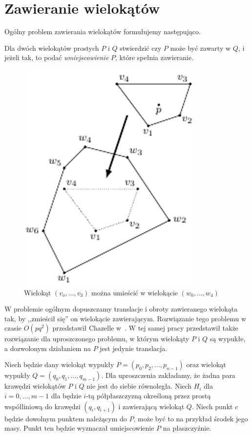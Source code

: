 \chapter{Zawieranie wielokątów}
Ogólny problem zawierania wielokątów formułujemy następująco.

\begin{problem}
  Dla dwóch wielokątów prostych $P$ i $Q$ stwierdzić czy $P$ może być
  zawarty w $Q$, i jeżeli tak, to podać \emph{umiejscowienie} $P$,
  które spełnia zawieranie.
\end{problem}

\begin{figure}[htb]
  \centering
  \includegraphics[scale=0.5]{img/containment1}
  \caption{Wielokąt $(v_o, \ldots, v_3)$ można umieścić w wielokącie
    $(w_0, \ldots, w_4)$\label{img:containment1}}
\end{figure}

W problemie ogólnym dopuszczamy translacje i obroty zawieranego
wielokąta tak, by ,,zmieścił się'' on wielokącie
zawierającym. Rozwiązanie tego problemu w czasie $O(pq^2)$ przedstawił
Chazelle w~\cite{Chazelle83}. W tej samej pracy przedstawił także
rozwiązanie dla uproszczonego problemu, w którym wielokąty $P$ i $Q$
są wypukłe, a dozwolonym działaniem na $P$ jest jedynie translacja.

Niech będzie dany wielokąt wypukły $P = (p_0, p_2, \ldots, p_{n-1})$
oraz wielokąt wypukły $Q = (q_0, q_1, \ldots, q_{m-1})$. Dla
uproszczenia zakładamy, że żadna para krawędzi wielokątów $P$ i $Q$
nie jest do siebie równoległa. Niech $H_i$ dla $i = 0, \ldots, m - 1$
dla będzie $i$-tą półpłaszczyzną określoną przez prostą współliniową
do krawędzi $(q_i, q_{i+1})$ i zawierającą wielokąt $Q$. Niech punkt $c$
będzie dowolnym punktem należącym do $P$, może być to na przykład
środek jego masy. Punkt ten będzie wyznaczał umiejscowienie $P$ na
płaszczyźnie.

